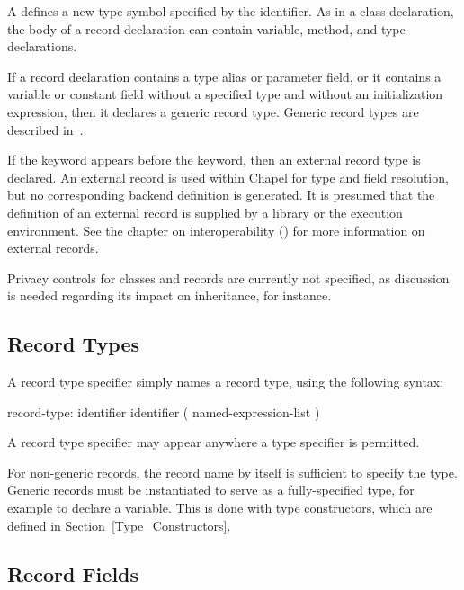 A  defines a new type symbol specified
by the identifier. As in a class declaration, the body of a record declaration
can contain variable, method, and type declarations.

If a record declaration contains a type alias or parameter field, or it
contains a variable or constant field without a specified type and
without an initialization expression, then it declares a generic record
type.  Generic record types are described in~.

If the  keyword appears before the  keyword, then an
external record type is declared. An external record is used within Chapel
for type and field resolution, but no corresponding backend definition is
generated.  It is presumed that the definition of an external record is supplied
by a library or the execution environment.  See the chapter on interoperability
() for more information on external records.

\begin{future}
Privacy controls for classes and records are currently not specified,
as discussion is needed regarding its impact on inheritance, for
instance.
\end{future}

\subsection{Record Types}
\label{Record_Types}

A record type specifier simply names a record type, using
the following syntax:
\begin{syntax}
record-type:
  identifier
  identifier ( named-expression-list )
\end{syntax}
A record type specifier may appear anywhere a type specifier is permitted.

For non-generic records, the record name by itself is sufficient to specify the
type.  Generic records must be instantiated to serve as a fully-specified
type, for example to declare a variable.  This is done with
type constructors, which are defined in Section~\ref{Type_Constructors}.

\subsection{Record Fields}
\label{Record_Fields}

